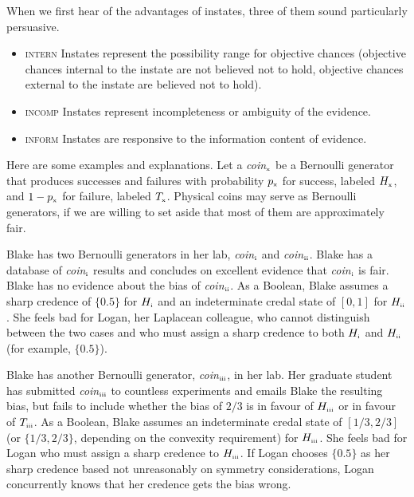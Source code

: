 \documentclass[11pt]{article}
\begin{document}
When we first hear of the advantages of instates, three of
them sound particularly persuasive.

\begin{itemize}
\item \textsc{intern} Instates represent the possibility range for
  objective chances (objective chances internal to the instate are not
  believed not to hold, objective chances external to the instate are
  believed not to hold).
\item \textsc{incomp} Instates represent incompleteness or
  ambiguity of the evidence.
\item \textsc{inform} Instates are responsive to the information
  content of evidence.
\end{itemize}

Here are some examples and explanations. Let a
\textit{coin}$_{\mbox{\tiny{x}}}$ be a Bernoulli generator that
produces successes and failures with probability $p_{\mbox{\tiny{x}}}$
for success, labeled $H_{\mbox{\tiny{x}}}$, and
$1-p_{\mbox{\tiny{x}}}$ for failure, labeled $T_{\mbox{\tiny{x}}}$.
Physical coins may serve as Bernoulli generators, if we are willing to
set aside that most of them are approximately fair.

\begin{quotex}
  \label{ex:range} Blake has two Bernoulli generators
  in her lab, \textit{coin}$_{\mbox{\tiny{i}}}$ and
  \textit{coin}$_{\mbox{\tiny{ii}}}$. Blake has a database of
  \textit{coin}$_{\mbox{\tiny{i}}}$ results and concludes on excellent
  evidence that \textit{coin}$_{\mbox{\tiny{i}}}$ is fair. Blake has
  no evidence about the bias of \textit{coin}$_{\mbox{\tiny{ii}}}$. As
  a Boolean, Blake assumes a sharp credence of $\{0.5\}$ for
  $H_{\mbox{\tiny{i}}}$ and an indeterminate credal state of $[0,1]$
  for $H_{\mbox{\tiny{ii}}}$. She feels bad for Logan, her Laplacean
  colleague, who cannot distinguish between the two cases and who must
  assign a sharp credence to both $H_{\mbox{\tiny{i}}}$ and
  $H_{\mbox{\tiny{ii}}}$ (for example, $\{0.5\}$).
\end{quotex}

\begin{quotex}
  \label{ex:incomp} Blake has another Bernoulli
  generator, \textit{coin}$_{\mbox{\tiny{iii}}}$, in her lab. Her
  graduate student has submitted \textit{coin}$_{\mbox{\tiny{iii}}}$
  to countless experiments and emails Blake the resulting bias, but
  fails to include whether the bias of $2/3$ is in favour of
  $H_{\mbox{\tiny{iii}}}$ or in favour of $T_{\mbox{\tiny{iii}}}$. As
  a Boolean, Blake assumes an indeterminate credal state of
  $[1/3,2/3]$ (or $\{1/3,2/3\}$, depending on the convexity
  requirement) for $H_{\mbox{\tiny{iii}}}$. She feels bad for Logan
  who must assign a sharp credence to $H_{\mbox{\tiny{iii}}}$. If
  Logan chooses $\{0.5\}$ as her sharp credence based not unreasonably
  on symmetry considerations, Logan concurrently knows that her
  credence gets the bias wrong.
\end{quotex}
\end{document}
